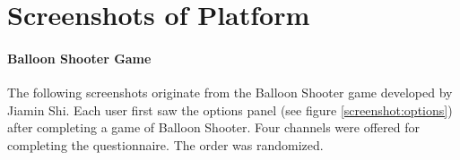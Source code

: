       



\clearpage

\label{appendix:interviews}

  
  \label{appendix:interview-participant}

  
  \label{appendix:interview-passerby}

  
  \label{appendix:semi-structured-interview}





\cleardoublepage
\section{Screenshots of Platform}



\paragraph{Balloon Shooter Game}


\label{appendix:screenshots-balloon-shooter}

The following screenshots originate from the Balloon Shooter game developed by Jiamin Shi.
Each user first saw the options panel (see figure \ref{screenshot:options}) after completing a game of Balloon Shooter. Four channels were offered for completing the questionnaire. The order was randomized. \\




